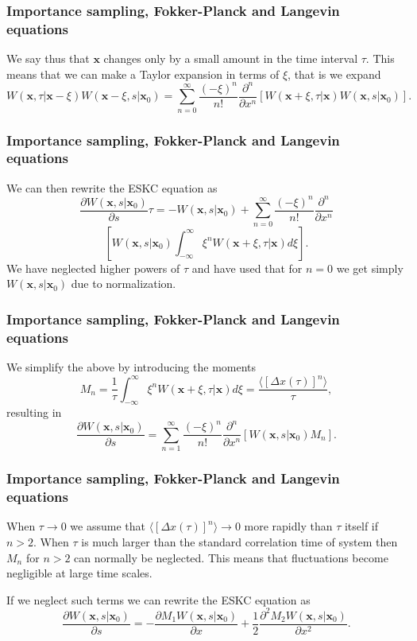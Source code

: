 \documentclass{beamer}
\begin{document}
\begin{frame}
\frametitle{Importance sampling, Fokker-Planck and Langevin equations}

We say thus that $\mathbf{x}$ changes only by a small amount in the time interval $\tau$. 
This means that we can make a Taylor expansion in terms of $\xi$, that is we
expand
\[
W(\mathbf{x},\tau|\mathbf{x}-\xi)W(\mathbf{x}-\xi,s|\mathbf{x}_0) =
\sum_{n=0}^{\infty}\frac{(-\xi)^n}{n!}\frac{\partial^n}{\partial x^n}\left[W(\mathbf{x}+\xi,\tau|\mathbf{x})W(\mathbf{x},s|\mathbf{x}_0)
\right].
\]
\end{frame}

\begin{frame}
\frametitle{Importance sampling, Fokker-Planck and Langevin equations}

\begin{block}{}
We can then rewrite the ESKC equation as 
\[
\frac{\partial W(\mathbf{x},s|\mathbf{x}_0)}{\partial s}\tau=-W(\mathbf{x},s|\mathbf{x}_0)+
\sum_{n=0}^{\infty}\frac{(-\xi)^n}{n!}\frac{\partial^n}{\partial x^n}
\]
\[
\left[W(\mathbf{x},s|\mathbf{x}_0)\int_{-\infty}^{\infty} \xi^nW(\mathbf{x}+\xi,\tau|\mathbf{x})d\xi\right].
\]
We have neglected higher powers of $\tau$ and have used that for $n=0$ 
we get simply $W(\mathbf{x},s|\mathbf{x}_0)$ due to normalization.

\end{block}
\end{frame}

\begin{frame}
\frametitle{Importance sampling, Fokker-Planck and Langevin equations}

\begin{block}{}
We simplify the above by introducing the moments 
\[
M_n=\frac{1}{\tau}\int_{-\infty}^{\infty} \xi^nW(\mathbf{x}+\xi,\tau|\mathbf{x})d\xi=
\frac{\langle [\Delta x(\tau)]^n\rangle}{\tau},
\]
resulting in
\[
\frac{\partial W(\mathbf{x},s|\mathbf{x}_0)}{\partial s}=
\sum_{n=1}^{\infty}\frac{(-\xi)^n}{n!}\frac{\partial^n}{\partial x^n}
\left[W(\mathbf{x},s|\mathbf{x}_0)M_n\right].
\]
\end{block}
\end{frame}

\begin{frame}
\frametitle{Importance sampling, Fokker-Planck and Langevin equations}

\begin{block}{}
When $\tau \rightarrow 0$ we assume that $\langle [\Delta x(\tau)]^n\rangle \rightarrow 0$ more rapidly than $\tau$ itself if $n > 2$. 
When $\tau$ is much larger than the standard correlation time of 
system then $M_n$ for $n > 2$ can normally be neglected.
This means that fluctuations become negligible at large time scales.

If we neglect such terms we can rewrite the ESKC equation as 
\[
\frac{\partial W(\mathbf{x},s|\mathbf{x}_0)}{\partial s}=
-\frac{\partial M_1W(\mathbf{x},s|\mathbf{x}_0)}{\partial x}+
\frac{1}{2}\frac{\partial^2 M_2W(\mathbf{x},s|\mathbf{x}_0)}{\partial x^2}.
\]
\end{block}
\end{frame}
\end{document}
